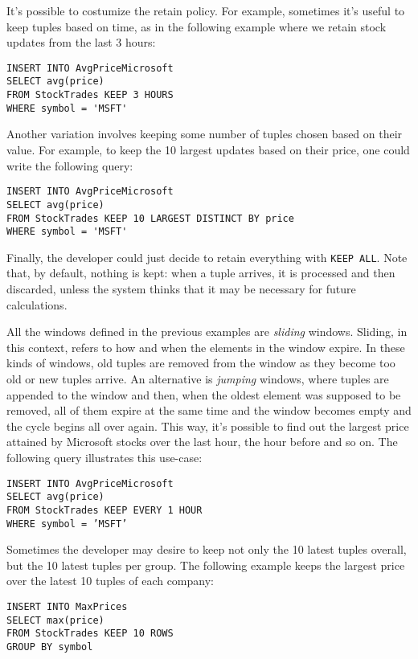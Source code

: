 \documentclass[twoside]{report}
\begin{document}
It's possible to costumize the retain policy. For example, sometimes it's useful to keep tuples based on time, as in the following example where we retain stock updates from the last 3 hours:

\begin{verbatim}
INSERT INTO AvgPriceMicrosoft
SELECT avg(price)
FROM StockTrades KEEP 3 HOURS
WHERE symbol = 'MSFT'
\end{verbatim}

Another variation involves keeping some number of tuples chosen based on their value. For example, to keep the 10 largest updates based on their price, one could write the following query:

\begin{verbatim}
INSERT INTO AvgPriceMicrosoft
SELECT avg(price)
FROM StockTrades KEEP 10 LARGEST DISTINCT BY price
WHERE symbol = 'MSFT'
\end{verbatim}

Finally, the developer could just decide to retain everything with \verb=KEEP ALL=. Note that, by default, nothing is kept: when a tuple arrives, it is processed and then discarded, unless the system thinks that it may be necessary for future calculations.

All the windows defined in the previous examples are \emph{sliding} windows. Sliding, in this context, refers to how and when the elements in the window expire. In these kinds of windows, old tuples are removed from the window as they become too old or new tuples arrive. An alternative is \emph{jumping} windows, where tuples are appended to the window and then, when the oldest element was supposed to be removed, all of them expire at the same time and the window becomes empty and the cycle begins all over again. This way, it's possible to find out the largest price attained by Microsoft stocks over the last hour, the hour before and so on. The following query illustrates this use-case:

\begin{verbatim}
INSERT INTO AvgPriceMicrosoft
SELECT avg(price)
FROM StockTrades KEEP EVERY 1 HOUR
WHERE symbol = ’MSFT’
\end{verbatim}

Sometimes the developer may desire to keep not only the 10 latest tuples overall, but the 10 latest tuples per group. The following example keeps the largest price over the latest 10 tuples of each company:

\begin{verbatim}
INSERT INTO MaxPrices
SELECT max(price)
FROM StockTrades KEEP 10 ROWS
GROUP BY symbol
\end{verbatim}
\end{document}
